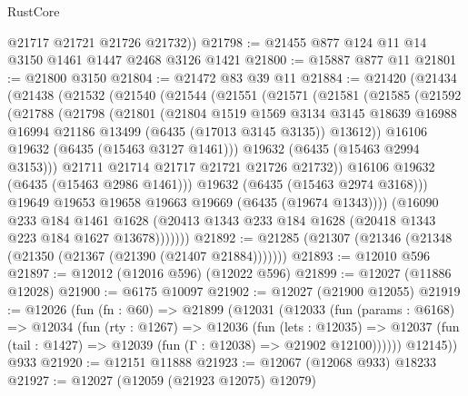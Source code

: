 \begin{lexlean}{RustCore}
\begin{coremodule}
        @21717
        @21721
        @21726
        @21732))
@21798 := @21455 @877 @124 @11 @14 @3150 @1461 @1447 @2468 @3126 @1421
@21800 := @15887 @877 @11
@21801 := @21800 @3150
@21804 := @21472 @83 @39 @11
@21884 := @21420
    (@21434
      (@21438
        (@21532
          (@21540
            (@21544
              (@21551
                (@21571
                  (@21581
                    (@21585
                      (@21592
                        (@21788
                          (@21798
                            (@21801
                              (@21804
                                @1519
                                @1569
                                @3134
                                @3145
                                @18639
                                @16988
                                @16994
                                @21186
                                @13499
                                (@6435 (@17013 @3145 @3135))
                                @13612))
                            @16106
                            @19632
                            (@6435 (@15463 @3127 @1461)))
                          @19632
                          (@6435 (@15463 @2994 @3153)))
                        @21711
                        @21714
                        @21717
                        @21721
                        @21726
                        @21732))
                    @16106
                    @19632
                    (@6435 (@15463 @2986 @1461)))
                  @19632
                  (@6435 (@15463 @2974 @3168)))
                @19649
                @19653
                @19658
                @19663
                @19669
                (@6435 (@19674 @1343))))
            (@16090
              @233
              @184
              @1461
              @1628
              (@20413 @1343 @233 @184 @1628 (@20418 @1343 @223 @184 @1627 @13678)))))))
@21892 := @21285 (@21307 (@21346 (@21348 (@21350 (@21367 (@21390 (@21407 @21884)))))))
@21893 := @12010 @596
@21897 := @12012 (@12016 @596) (@12022 @596)
@21899 := @12027 (@11886 @12028)
@21900 := @6175 @10097
@21902 := @12027 (@21900 @12055)
@21919 := @12026
    (fun (fn : @60) =>
    @21899
      (@12031
        (@12033
          (fun (params : @6168) =>
          @12034
            (fun (rty : @1267) =>
            @12036
              (fun (lets : @12035) =>
              @12037 (fun (tail : @1427) => @12039 (fun (Γ : @12038) => @21902 @12100))))))
        @12145))
    @933
@21920 := @12151 @11888
@21923 := @12067 (@12068 @933) @18233
@21927 := @12027 (@12059 (@21923 @12075) @12079)

\end{coremodule}
\end{lexlean}

